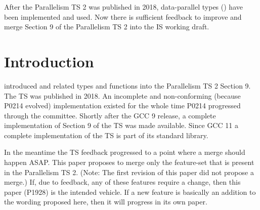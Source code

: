 \begin{wgTitlepage}
  After the Parallelism TS 2 was published in 2018, data-parallel types
  (\simdT) have been implemented and used.
  Now there is sufficient feedback to improve and merge Section 9 of the
  Parallelism TS 2 into the IS working draft.
\end{wgTitlepage}

\pagestyle{scrheadings}




\section{Introduction}
\cite{P0214R9} introduced \stdx{} and related types and functions
into the Parallelism TS 2 Section 9.
The TS was published in 2018.
An incomplete and non-conforming (because P0214 evolved) implementation existed for the whole time P0214 progressed through the committee.
Shortly after the GCC 9 release, a complete implementation of Section 9 of the TS was made available.
Since GCC 11 a complete  implementation of the TS is part of its standard library.

In the meantime the TS feedback progressed to a point where a merge should happen ASAP.
This paper proposes to merge only the feature-set that is present in the Parallelism TS 2.
(Note: The first revision of this paper did not propose a merge.)
If, due to feedback, any of these features require a change, then this paper (P1928) is the intended vehicle.
If a new feature is basically an addition to the wording proposed here, then it will progress in its own paper.

